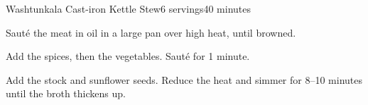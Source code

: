 \documentclass[../Cookbook.tex]{subfiles}
\begin{document}
\begin{recipe}{Washtunkala Cast-iron Kettle Stew}{6 servings}{40 minutes}

Saut\'e the meat in oil in a large pan over high heat, until browned.

Add the spices, then the vegetables. Saut\'e for 1 minute.

Add the stock and sunflower seeds. Reduce the heat and simmer for 8--10 minutes until the broth thickens up.


\end{recipe}
\end{document}
